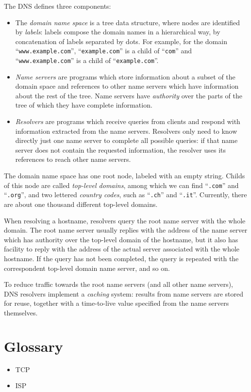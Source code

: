 \documentclass[mscthesis]{usiinfthesis}
\begin{document}
The DNS defines three components:
\begin{itemize}
	\item The \emph{domain name space} is a tree data structure, where nodes are identified by \emph{labels}: labels compose the domain names in a hierarchical way, by concatenation of labels separated by dots. For example, for the domain ``\texttt{www.example.com}'', ``\texttt{example.com}'' is a child of ``\texttt{com}'' and ``\texttt{www.example.com}'' is a child of ``\texttt{example.com}''.
	\item \emph{Name servers} are programs which store information about a subset of the domain space and references to other name servers which have information about the rest of the tree. Name servers have \emph{authority} over the parts of the tree of which they have complete information.
	\item \emph{Resolvers} are programs which receive queries from clients and respond with information extracted from the name servers. Resolvers only need to know directly just one name server to complete all possible queries: if that name server does not contain the requested information, the resolver uses its references to reach other name servers.
\end{itemize}
The domain name space has one root node, labeled with an empty string. Childs of this node are called \emph{top-level domains}, among which we can find ``\texttt{.com}'' and ``\texttt{.org}'', and two lettered \emph{country codes}, such as ``\texttt{.ch}'' and ``\texttt{.it}''. Currently, there are about one thousand different top-level domains\cite{website:tldlist}.

When resolving a hostname, resolvers query the root name server with the whole domain. The root name server usually replies with the address of the name server which has authority over the top-level domain of the hostname, but it also has facility to reply with the address of the actual server associated with the whole hostname. If the query has not been completed, the query is repeated with the correspondent top-level domain name server, and so on.

To reduce traffic towards the root name servers (and all other name servers), DNS resolvers implement a \emph{caching} system: results from name servers are stored for reuse, together with a time-to-live value specified from the name servers themselves. 

\backmatter

\chapter{Glossary}
\begin{itemize}
	\item TCP
	\item ISP
	
\end{itemize}

%
%


\end{document}
